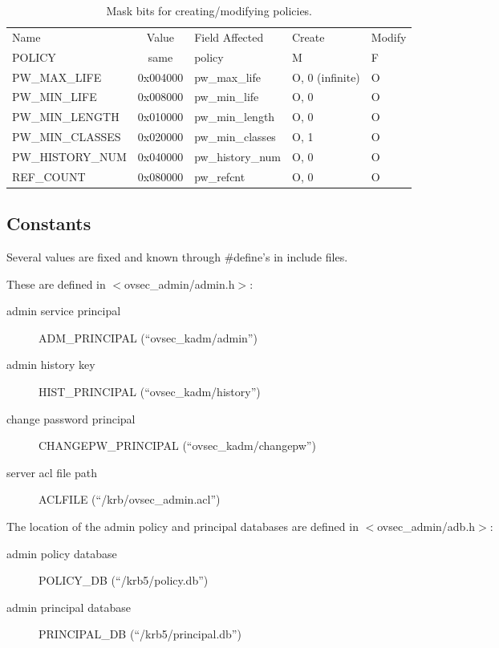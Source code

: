 \begin{table}[htbp]
\begin{tabular}{@{}lclll}
Name & Value & Field Affected & Create & Modify \\
POLICY                  & same     & policy & M & F \\
PW_MAX_LIFE             & 0x004000 & pw_max_life & O, 0 (infinite) & O \\
PW_MIN_LIFE             & 0x008000 & pw_min_life & O, 0 & O \\
PW_MIN_LENGTH           & 0x010000 & pw_min_length & O, 0 & O \\
PW_MIN_CLASSES          & 0x020000 & pw_min_classes & O, 1 & O \\
PW_HISTORY_NUM          & 0x040000 & pw_history_num & O, 0 & O \\
REF_COUNT               & 0x080000 & pw_refcnt & O, 0 & O 
\end{tabular}
\caption{Mask bits for creating/modifying policies.}
\label{tab:policy-bits}
\end{table}

\subsection{Constants}

Several values are fixed and known through \#define's in include files.  

These are defined in $<$ovsec_admin/admin.h$>$:

\begin{description}
\item[admin service principal] ADM_PRINCIPAL (``ovsec_kadm/admin'')
\item[admin history key] HIST_PRINCIPAL (``ovsec_kadm/history'')
\item[change password principal] CHANGEPW_PRINCIPAL (``ovsec_kadm/changepw'')
\item[server acl file path] ACLFILE (``/krb/ovsec_admin.acl'')
\end{description}

The location of the admin policy and principal databases are defined
in $<$ovsec_admin/adb.h$>$:

\begin{description}
\item[admin policy database] POLICY_DB (``/krb5/policy.db'')
\item[admin principal database] PRINCIPAL_DB (``/krb5/principal.db'')
\end{description}

